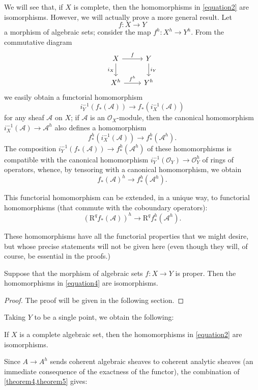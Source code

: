 \documentclass{article}
\theoremstyle{plain}
\newenvironment{theorem}[1]
    {\renewcommand\theinnercustomtheorem{#1}\innercustomtheorem}
    {\endinnercustomtheorem}
\newenvironment{corollary}[1]
    {\renewcommand\theinnercustomcorollary{#1}\innercustomcorollary}
    {\endinnercustomcorollary}
\theoremstyle{definition}
\newcommand{\sh}{\mathscr}
\newcommand{\RR}{\mathrm{R}}
\newcommand{\oldpage}[1]{\marginpar{\footnotesize$\Big\vert$ \textit{p.~#1}}}
\begin{document}
We will see that, if $X$ is complete, then the homomorphisms in \cref{equation2} are isomorphisms.
However, we will actually prove a more general result.
Let
\[
  f\colon X\to Y
\]
\oldpage{2-09}
a morphism of algebraic sets;
consider the map $f^h\colon X^h\to Y^h$.
From the commutative diagram
\[
  \begin{tikzcd}
    X \ar[r,"f"] \ar[d,swap,"i_X"]
    & Y \ar[d,"i_Y"]
  \\X^h \ar[r,"f^h"]
    & Y^h
  \end{tikzcd}
\]
we easily obtain a functorial homomorphism
\[
  i_Y^{-1}(f_*(\sh{A})) \to f_*(i_X^{-1}(\sh{A}))
\]
for any sheaf $\sh{A}$ on $X$;
if $\sh{A}$ is an $\sh{O}_X$-module, then the canonical homomorphism $i_X^{-1}(\sh{A})\to\sh{A}^h$ also defines a homomorphism
\[
  f_*^h(i_X^{-1}(\sh{A})) \to f_*^h(\sh{A}^h).
\]
The composition $i_Y^{-1}(f_*(\sh{A}))\to f_*^h(\sh{A}^h)$ of these homomorphisms is compatible with the canonical homomorphism $i_Y^{-1}(\sh{O}_Y)\to\sh{O}_Y^h$ of rings of operators, whence, by tensoring with a canonical homomorphism, we obtain
\[
\label{equation3}
  f_*(\sh{A})^h \to f_*^h(\sh{A}^h).
  \tag{3}
\]

This functorial homomorphism can be extended, in a unique way, to functorial homomorphisms (that commute with the coboundary operators):
\[
\label{equation4}
  (\RR^qf_*(\sh{A}))^h \to \RR^qf_*^h(\sh{A}^h).
  \tag{4}
\]

These homomorphisms have all the functorial properties that we might desire, but whose precise statements will not be given here (even though they will, of course, be essential in the proofs.)

\begin{theorem}{5}
\label{theorem5}
  Suppose that the morphism of algebraic sets $f\colon X\to Y$ is proper.
  Then the homomorphisms in \cref{equation4} are isomorphisms.
\end{theorem}

\begin{proof}
  The proof will be given in the following section.
\end{proof}

Taking $Y$ to be a single point, we obtain the following:

\begin{corollary}{1}
\label{corollary1-5}
  If $X$ is a complete algebraic set, then the homomorphisms in \cref{equation2} are isomorphisms.
\end{corollary}

Since $A\to A^h$ sends coherent algebraic sheaves to coherent analytic sheaves (an immediate consequence of the exactness of the functor), the combination of \cref{theorem4,theorem5} gives:
\end{document}
